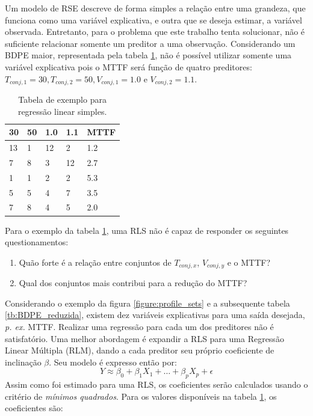 Um modelo de RSE descreve de forma simples a relação entre uma grandeza, que funciona como uma variável explicativa, e outra que se deseja estimar, a variável observada.
Entretanto, para o problema que este trabalho tenta solucionar, não é suficiente relacionar somente um preditor a uma observação. Considerando um BDPE maior, representada pela tabela \ref{tb:regressao_simples_exemplo}, não é possível utilizar somente uma variável explicativa pois o MTTF será função de quatro preditores: $T_{conj,1}=30, T_{conj,2}=50, V_{conj,1}=1.0$ e $V_{conj,2}=1.1$.
\begin{table}[H]
	\centering
	\caption{Tabela de exemplo para regressão linear simples.}
	\begin{tabular}{@{}l|l|l|l|l@{}}
		\toprule
		30 & 50 & 1.0 & 1.1 & MTTF \\ \midrule
		13 & 1 & 12 & 2 & 1.2 \\
		7 & 8 & 3 & 12 & 2.7 \\
		1 & 1 & 2 & 2 & 5.3 \\
		5 & 5 & 4 & 7 & 3.5 \\		
		7 & 8 & 4 & 5 & 2.0 \\ \bottomrule
	\end{tabular}
	\label{tb:regressao_simples_exemplo}
\end{table}
Para o exemplo da tabela \ref{tb:regressao_simples_exemplo}, uma RLS não é capaz de responder os seguintes questionamentos:
\begin{enumerate}
	\item Quão forte é a relação entre conjuntos de $T_{conj,x}$, $V_{conj,y}$ e o MTTF?
	\item Qual dos conjuntos mais contribui para a redução do MTTF? 
\end{enumerate}
Considerando o exemplo da figura \ref{figure:profile_sets} e a subsequente tabela \ref{tb:BDPE_reduzida}, existem dez variáveis explicativas para uma saída desejada, \textit{p. ex.} MTTF. Realizar uma regressão para cada um dos preditores não é satisfatório. Uma melhor abordagem é expandir a RLS para uma Regressão Linear Múltipla (RLM), dando a cada preditor seu próprio coeficiente de inclinação $\beta$. Seu modelo é expresso então por:
\begin{equation}
\label{eq:regressao_linear_multipla}
Y \approx \beta_0+\beta_1X_1 +\dots +\beta_pX_p +\epsilon
\end{equation}
Assim como foi estimado para uma RLS, os coeficientes serão calculados usando o critério de \textit{mínimos quadrados}. Para os valores disponíveis na tabela \ref{tb:regressao_simples_exemplo}, os coeficientes são:
